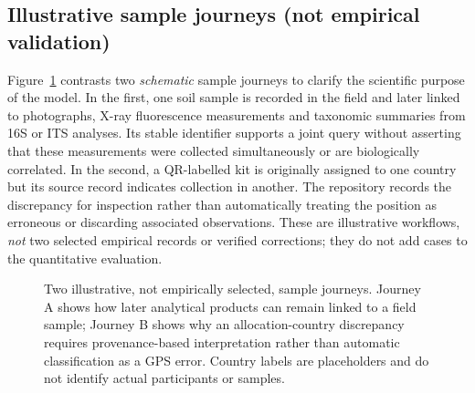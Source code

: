 \documentclass[11pt,a4paper]{article}
\begin{document}
\subsection{Illustrative sample journeys (not empirical validation)}
Figure~\ref{fig:sample-journeys} contrasts two \emph{schematic} sample journeys to clarify the scientific purpose of the model. In the first, one soil sample is recorded in the field and later linked to photographs, X-ray fluorescence measurements and taxonomic summaries from 16S or ITS analyses. Its stable identifier supports a joint query without asserting that these measurements were collected simultaneously or are biologically correlated. In the second, a QR-labelled kit is originally assigned to one country but its source record indicates collection in another. The repository records the discrepancy for inspection rather than automatically treating the position as erroneous or discarding associated observations. These are illustrative workflows, \emph{not} two selected empirical records or verified corrections; they do not add cases to the quantitative evaluation.

\begin{figure}[htbp]
\centering
{}
\caption{Two illustrative, not empirically selected, sample journeys. Journey A shows how later analytical products can remain linked to a field sample; Journey B shows why an allocation-country discrepancy requires provenance-based interpretation rather than automatic classification as a GPS error. Country labels are placeholders and do not identify actual participants or samples.}
\label{fig:sample-journeys}
\end{figure}
\end{document}
